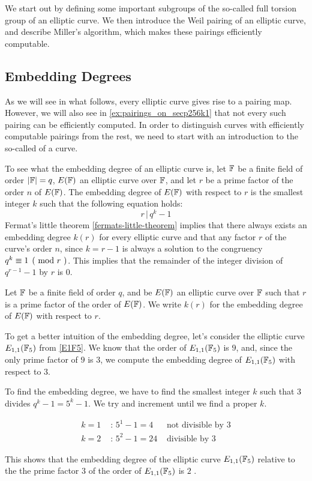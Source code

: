 We start out by defining some important subgroups of the so-called full torsion group of an elliptic curve. We then introduce the Weil pairing of an elliptic curve, and describe Miller's algorithm, which makes these pairings efficiently computable.

\subsection{Embedding Degrees} As we will see in what follows, every elliptic curve gives rise to a pairing map. However, we will also see in \examplename{} \ref{ex:pairings_on_secp256k1} that not every such pairing can be efficiently computed. In order to distinguish curves with efficiently computable pairings from the rest, we need to start with an introduction to the so-called  of a curve. 

To see what the embedding degree of an elliptic curve is, let $\mathbb{F}$ be a finite field of order $|\mathbb{F}|=q$, $E(\mathbb{F})$ an elliptic curve over $\mathbb{F}$, and let $r$ be a prime factor of the order $n$ of $E(\mathbb{F})$. The embedding degree of $E(\mathbb{F})$ with respect to $r$ is  the smallest integer $k$ such that the following equation holds:
\begin{equation}
\label{def:embedding-degree}
r\,|\, q^k-1
\end{equation}
Fermat's little theorem \eqref{fermats-little-theorem} implies that there always exists an embedding degree $k(r)$ for every elliptic curve and that any factor $r$ of the curve's order $n$, since $k=r-1$ is always a solution to the congruency $\kongru{q^{k}}{1}{r}$. This implies that the remainder of the integer division of $q^{r-1}-1$ by $r$ is $0$.

\begin{notation} Let $\mathbb{F}$ be a finite field of order $q$, and be $E(\mathbb{F})$ an elliptic curve over $\mathbb{F}$ such that $r$ is a prime factor of the order of $E(\mathbb{F})$. We write $k(r)$ for the embedding degree of $E(\mathbb{F})$ with respect to $r$.
\end{notation}

\begin{example} To get a better intuition of the embedding degree, let's consider the elliptic curve $E_{1,1}(\mathbb{F}_5)$ from \examplename{} \ref{E1F5}. We know that the order of $E_{1,1}(\mathbb{F}_5)$ is $9$, and, since the only prime factor of $9$ is $3$, we compute the embedding degree of $E_{1,1}(\mathbb{F}_5)$ with respect to $3$. 

To find the embedding degree, we have to find the smallest integer $k$ such that $3$ divides $q^k-1= 5^k-1$. We try and increment until we find a proper $k$. 

\begin{align*}
k=1 &\text{ : } 5^1-1 = 4 & \text{ not divisible by } 3\\ 
k=2 &\text{ : } 5^2-1 = 24 & \text{ divisible by } 3
\end{align*} 

This shows that the embedding degree of the elliptic curve $E_{1,1}(\mathbb{F}_5)$ relative to the the prime factor $3$ of the order of $E_{1,1}(\mathbb{F}_5)$ is $2$ .
\end{example}

